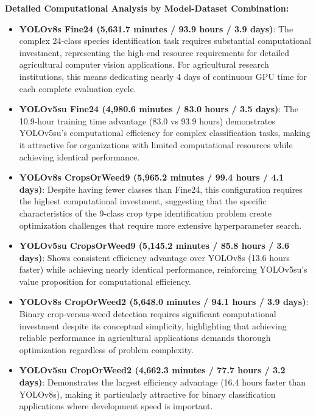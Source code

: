 \textbf{Detailed Computational Analysis by Model-Dataset Combination:}

\begin{itemize}
    \item \textbf{YOLOv8s Fine24 (5,631.7 minutes / 93.9 hours / 3.9 days)}: The complex 24-class species identification task requires substantial computational investment, representing the high-end resource requirements for detailed agricultural computer vision applications. For agricultural research institutions, this means dedicating nearly 4 days of continuous GPU time for each complete evaluation cycle.
    
    \item \textbf{YOLOv5su Fine24 (4,980.6 minutes / 83.0 hours / 3.5 days)}: The 10.9-hour training time advantage (83.0 vs 93.9 hours) demonstrates YOLOv5su's computational efficiency for complex classification tasks, making it attractive for organizations with limited computational resources while achieving identical performance.
    
    \item \textbf{YOLOv8s CropsOrWeed9 (5,965.2 minutes / 99.4 hours / 4.1 days)}: Despite having fewer classes than Fine24, this configuration requires the highest computational investment, suggesting that the specific characteristics of the 9-class crop type identification problem create optimization challenges that require more extensive hyperparameter search.
    
    \item \textbf{YOLOv5su CropsOrWeed9 (5,145.2 minutes / 85.8 hours / 3.6 days)}: Shows consistent efficiency advantage over YOLOv8s (13.6 hours faster) while achieving nearly identical performance, reinforcing YOLOv5su's value proposition for computational efficiency.
    
    \item \textbf{YOLOv8s CropOrWeed2 (5,648.0 minutes / 94.1 hours / 3.9 days)}: Binary crop-versus-weed detection requires significant computational investment despite its conceptual simplicity, highlighting that achieving reliable performance in agricultural applications demands thorough optimization regardless of problem complexity.
    
    \item \textbf{YOLOv5su CropOrWeed2 (4,662.3 minutes / 77.7 hours / 3.2 days)}: Demonstrates the largest efficiency advantage (16.4 hours faster than YOLOv8s), making it particularly attractive for binary classification applications where development speed is important.
    

\end{itemize}

